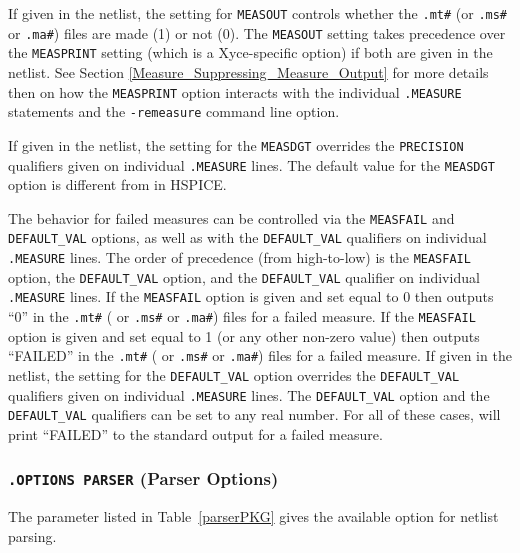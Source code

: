 If given in the netlist, the setting for \texttt{MEASOUT} controls whether 
the \texttt{.mt\#} (or \texttt{.ms\#} or \texttt{.ma\#}) files are made (1) or not (0). 
The \texttt{MEASOUT} setting takes precedence over the \texttt{MEASPRINT} setting 
(which is a Xyce-specific option) if both are given in the netlist.
See Section \ref{Measure_Suppressing_Measure_Output} for more details then on 
how the \texttt{MEASPRINT} option interacts with the individual 
\texttt {.MEASURE} statements and the \texttt{-remeasure} command 
line option.

If given in the netlist, the setting for the \texttt{MEASDGT} overrides the 
\texttt{PRECISION} qualifiers given on individual \texttt{.MEASURE} lines. 
The default value for the \texttt{MEASDGT} option is different from in HSPICE.

The \Xyce{} behavior for failed measures can be controlled via the \texttt{MEASFAIL}
and \texttt{DEFAULT\_VAL} options, as well as with the \texttt{DEFAULT\_VAL} 
qualifiers on individual \texttt{.MEASURE} lines.  The order of precedence (from 
high-to-low) is the \texttt{MEASFAIL} option, the \texttt{DEFAULT\_VAL} option, 
and the \texttt{DEFAULT\_VAL} qualifier on individual \texttt{.MEASURE} lines.  
If the \texttt{MEASFAIL} option is given and set equal to 0 then \Xyce{} outputs 
``0'' in the \texttt{.mt\#} ( or \texttt{.ms\#} or \texttt{.ma\#}) files for a failed measure.  
If the \texttt{MEASFAIL} option is given and set equal to 1 (or any other non-zero 
value) then \Xyce{} outputs ``FAILED'' in the \texttt{.mt\#} ( or \texttt{.ms\#} or \texttt{.ma\#}) 
files for a failed measure.  If given in the netlist, the setting for the 
\texttt{DEFAULT\_VAL} option overrides the \texttt{DEFAULT\_VAL} qualifiers given 
on individual \texttt{.MEASURE} lines.  The \texttt{DEFAULT\_VAL} option and the 
\texttt{DEFAULT\_VAL} qualifiers can be set to any real number.  For all of these 
cases, \Xyce{} will print ``FAILED'' to the standard output for a failed measure. 



\subsubsection{\texttt{.OPTIONS PARSER} (Parser Options)}
The parameter listed in Table~\ref{parserPKG} gives the available
option for netlist parsing.




